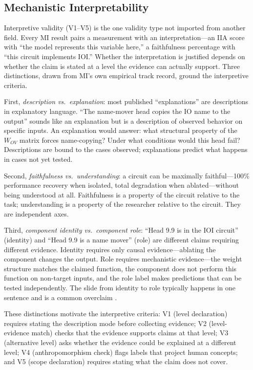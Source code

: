 \documentclass[10pt]{article}
\begin{document}
\subsection{Mechanistic Interpretability}
\label{sec:mi-lens}

Interpretive validity (V1--V5) is the one validity type not imported from another field. Every MI result pairs a measurement with an interpretation---an IIA score with ``the model represents this variable here,'' a faithfulness percentage with ``this circuit implements IOI.'' Whether the interpretation is justified depends on whether the claim is stated at a level the evidence can actually support. Three distinctions, drawn from MI's own empirical track record, ground the interpretive criteria.

First, \emph{description vs.\ explanation}: most published ``explanations'' are descriptions in explanatory language. ``The name-mover head copies the IO name to the output'' sounds like an explanation but is a description of observed behavior on specific inputs. An explanation would answer: what structural property of the $W_{OV}$ matrix forces name-copying? Under what conditions would this head fail? Descriptions are bound to the cases observed; explanations predict what happens in cases not yet tested.

Second, \emph{faithfulness vs.\ understanding}: a circuit can be maximally faithful---100\% performance recovery when isolated, total degradation when ablated---without being understood at all. Faithfulness is a property of the circuit relative to the task; understanding is a property of the researcher relative to the circuit. They are independent axes.

Third, \emph{component identity vs.\ component role}: ``Head 9.9 is in the IOI circuit'' (identity) and ``Head 9.9 is a name mover'' (role) are different claims requiring different evidence. Identity requires only causal evidence---ablating the component changes the output. Role requires mechanistic evidence---the weight structure matches the claimed function, the component does not perform this function on non-target inputs, and the role label makes predictions that can be tested independently. The slide from identity to role typically happens in one sentence and is a common overclaim \citep{wang2023interpretability}.

These distinctions motivate the interpretive criteria: V1 (level declaration) requires stating the description mode before collecting evidence; V2 (level-evidence match) checks that the evidence supports claims at that level; V3 (alternative level) asks whether the evidence could be explained at a different level; V4 (anthropomorphism check) flags labels that project human concepts; and V5 (scope declaration) requires stating what the claim does not cover.
\end{document}
